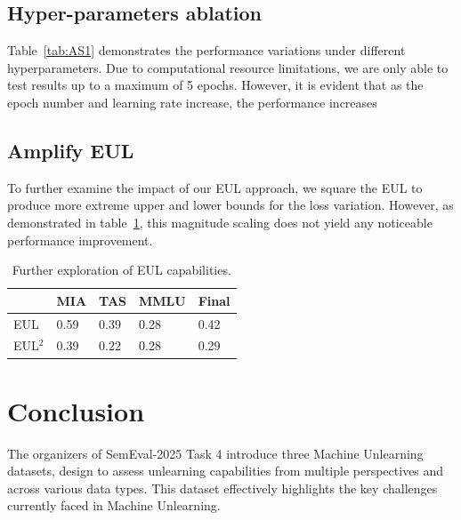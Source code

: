 \documentclass[11pt]{article}
\begin{document}
\subsection{Hyper-parameters ablation}  

Table~\ref{tab:AS1} demonstrates the performance variations under different hyperparameters. Due to computational resource limitations, we are only able to test results up to a maximum of 5 epochs. However, it is evident that as the epoch number and learning rate increase, the performance increases

\subsection{Amplify EUL} 
To further examine the impact of our EUL approach, we square the EUL to produce more extreme upper and lower bounds for the loss variation. However, as demonstrated in table~\ref{tab:accents}, this magnitude scaling does not yield any noticeable performance improvement.

\begin{table}[h]\footnotesize
  \centering
    \begin{tabular}{l|l|l|l|l}
    \hline
        ~ & MIA & TAS & MMLU & Final \\ \hline
        EUL & 0.59 & 0.39 & 0.28 & 0.42 \\ \hline
        EUL$^2$ & 0.39 & 0.22 & 0.28 & 0.29 \\ \hline
    \end{tabular}
  \caption{Further exploration of EUL capabilities.}
  \label{tab:accents}
\end{table}





\section{Conclusion} 
The organizers of SemEval-2025 Task 4 introduce three Machine Unlearning datasets, design to assess unlearning capabilities from multiple perspectives and across various data types. This dataset effectively highlights the key challenges currently faced in Machine Unlearning.
\end{document}
